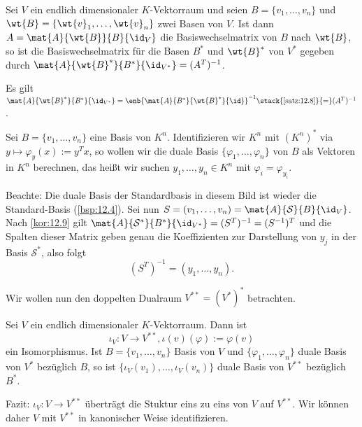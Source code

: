 \begin{korollar}
	\label{kor:12.9}
	Sei $V$ ein endlich dimensionaler $K$-Vektorraum und seien $B = \{v_1,\dots,v_n\}$ und $\wt{B} = \{\wt{v}_1,\dots,\wt{v}_n\}$ zwei Basen von $V$.
	Ist dann $A = \mat{A}{\wt{B}}{B}{\id_V}$ die Basiswechselmatrix von $B$ nach $\wt{B}$, so ist die Basiswechselmatrix für die Basen $B^*$ und $\wt{B}^*$ von $V^*$ gegeben durch $\mat{A}{\wt{B}^*}{B^*}{\id_{V^*}} = (A^T)^{-1}$.
\end{korollar}

\begin{beweis}
	Es gilt $\mat{A}{\wt{B}^*}{B^*}{\id_{V^*}} = \enb{\mat{A}{B^*}{\wt{B}^*}{\id}}^{-1} \stack{\ref{satz:12.8}}{=} (A^T)^{-1}$. \qedhere
\end{beweis}

\begin{anwendung}
	\label{anw:12.10}
	Sei $B = \{v_1,\dots,v_n\}$ eine Basis von $K^n$.
	Identifizieren wir $K^n$ mit $(K^n)^*$ via $y \mapsto \varphi_y(x) := y^Tx$, so wollen wir die duale Basis $\{\varphi_1,\dots,\varphi_n\}$ von $B$ als Vektoren in $K^n$ berechnen, das heißt wir suchen $y_1,\dots,y_n \in K^n$ mit $\varphi_i = \varphi_{y_i}$.
	
	Beachte: Die duale Basis der Standardbasis in diesem Bild ist wieder die Standard-Basis (\autoref{bsp:12.4}).
	Sei nun $S = (v_1,\dots,v_n) = \mat{A}{\mathcal{S}}{B}{\id_V}$.
	Nach \autoref{kor:12.9} gilt $\mat{A}{\mathcal{S}^*}{B^*}{\id_{V^*}} = (S^T)^{-1} = (S^{-1})^T$ und die Spalten dieser Matrix geben genau die Koeffizienten zur Darstellung von $y_j$ in der Basis $\mathcal{S}^*$, also folgt
	\[
		(S^T)^{-1} = (y_1,\dots,y_n).
	\]
\end{anwendung}

Wir wollen nun den doppelten Dualraum $V^{**} = (V^*)^*$ betrachten.

\begin{satz}
	\label{satz:12.11}
	Sei $V$ ein endlich dimensionaler $K$-Vektorraum.
	Dann ist
	\[
		\iota_V \colon V \rightarrow V^{**}, \iota(v)(\varphi) := \varphi(v)
	\]
	ein Isomorphismus.
	Ist $B = \{v_1,\dots,v_n\}$ Basis von $V$ und $\{\varphi_1,\dots,\varphi_n\}$ duale Basis von $V^*$ bezüglich $B$, so ist $\{\iota_V(v_1),\dots,\iota_V(v_n)\}$ duale Basis von $V^{**}$ bezüglich $B^*$.
\end{satz}
\newpage
Fazit: $\iota_V \colon V \rightarrow V^{**}$ überträgt die Stuktur eins zu eins von $V$ auf $V^{**}$.
Wir können daher $V$ mit $V^{**}$ in kanonischer Weise identifizieren.

